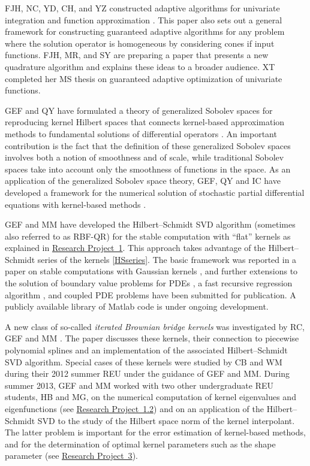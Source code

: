 \documentclass[11pt]{NSFamsart}
\newcommand{\Matlab}{{\sc Matlab}\xspace}
\newcommand{\refproba}{\hyperref[SectHSSVD]{Research Project~1}\xspace}
\newcommand{\refprobab}{\hyperref[NumerEigensubsec]{Research Project~1.2}\xspace}
\newcommand{\refprobc}{\hyperref[combinesec]{Research Project~3}\xspace}
\begin{document}
FJH, NC, YD, CH, and YZ constructed adaptive algorithms for univariate integration and function approximation \citep{HicEtal14b}.  This paper also sets out a general framework for constructing guaranteed adaptive algorithms for any problem where the solution operator is homogeneous by considering cones if input functions.  FJH, MR, and SY are preparing a paper that presents a new quadrature algorithm and explains these ideas to a broader audience.  XT completed her MS thesis \citep{Ton14a} on guaranteed adaptive optimization of univariate functions.

GEF and QY have formulated a theory of generalized Sobolev spaces for reproducing kernel Hilbert spaces that connects kernel-based approximation methods to fundamental solutions of differential operators \cite{FasshauerYe11, FasshauerYe13}. An important contribution is the fact that the definition of these generalized Sobolev spaces involves both a notion of smoothness and of scale, while traditional Sobolev spaces take into account only the smoothness of functions in the space.
As an application of the generalized Sobolev space theory, GEF, QY and IC have developed a framework for the numerical solution of stochastic partial differential equations with kernel-based methods \citep{CFY12,FasshauerYe13b,FasshauerYe14}.

GEF and MM have developed the Hilbert--Schmidt SVD algorithm (sometimes also referred to as RBF-QR) for the stable computation with ``flat'' kernels as explained in \refproba. This approach takes advantage of the Hilbert--Schmidt series of the kernels \eqref{HSseries}. The basic framework was reported in a paper on stable computations with Gaussian kernels \citep{FMcC12}, and further extensions to the solution of boundary value problems for PDEs \citep{McCourt13}, a fast recursive regression algorithm \citep{McCourt13b}, and coupled PDE problems \citep{McCF14} have been submitted for publication. A publicly available library of \Matlab code \citep{McCFBG13} is under ongoing development.

A new class of so-called \emph{iterated Brownian bridge kernels} was investigated by RC, GEF and MM \citep{CavorettoEtAl14}. The paper discusses these kernels, their connection to piecewise polynomial splines and an implementation of the associated Hilbert--Schmidt SVD algorithm. Special cases of these kernels were studied by CB and WM during their 2012 summer REU under the guidance of GEF and MM. During summer 2013, GEF and MM worked with two other undergraduate REU students, HB and MG, on the numerical computation of kernel eigenvalues and eigenfunctions (see \refprobab) and on an application of the Hilbert--Schmidt SVD to the study of the Hilbert space norm of the kernel interpolant. The latter problem is important for the error estimation of kernel-based methods, and for the determination of optimal kernel parameters such as the shape parameter (see \refprobc).
\end{document}
